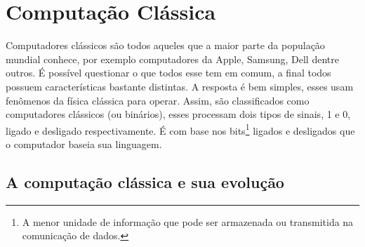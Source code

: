 \section{Computação Clássica} 
Computadores clássicos são todos aqueles que a maior parte da população mundial conhece, por exemplo computadores da Apple, Samsung, Dell dentre outros. É possível questionar o que todos esse tem em comum, a final todos possuem características bastante distintas. A resposta é bem simples, esses usam fenômenos da física clássica para operar. Assim, são classificados como computadores clássicos (ou binários), esses processam dois tipos de sinais, 1 e 0, ligado e desligado respectivamente. É com base nos bits\footnote{A menor unidade de informação que pode ser armazenada ou transmitida na comunicação de dados.} ligados e desligados que o computador baseia sua linguagem.\par

\subsection{A computação clássica e sua evolução}
\newpage
